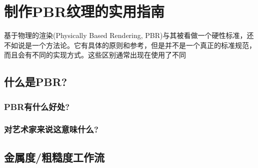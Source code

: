\chapter{制作PBR纹理的实用指南}

基于物理的渲染(Physically Based Rendering, PBR)与其被看做一个硬性标准，还不如说是一个方法论。它有具体的原则和参考，但是并不是一个真正的标准规范，而且会有不同的实现方式。这些区别通常出现在使用了不同

\section{什么是PBR?}

\subsection{PBR有什么好处?}

\subsection{对艺术家来说这意味什么?}

\section{金属度/粗糙度工作流}

